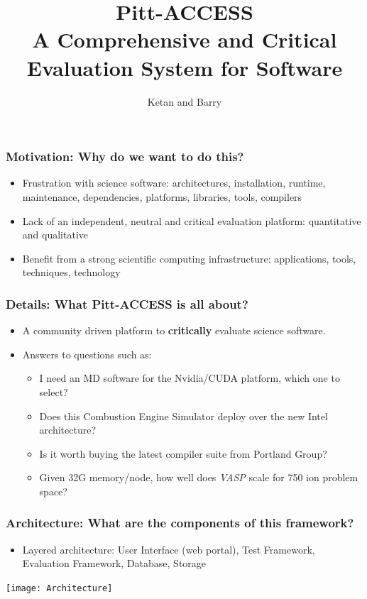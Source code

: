 \documentclass[hyperref={pdfpagelabels=false},12pt]{beamer}
\title[Pitt Access]{{\large Pitt-ACCESS\\ A Comprehensive and Critical Evaluation System for Software}}
\author[Pitt-Access]{{Ketan and Barry}}
\date{}
\begin{document}
\begin{frame}[plain]
\titlepage
\end{frame}

\begin{frame}
\frametitle{Motivation: Why do we want to do this?}
\begin{itemize}
\itemsep1em
\item 
Frustration with science software: architectures, installation, runtime, maintenance, dependencies, platforms, libraries, tools, compilers
\item 
Lack of an independent, neutral and critical evaluation platform: quantitative and qualitative
\item 
Benefit from a strong scientific computing infrastructure: applications, tools, techniques, technology
\end{itemize}
\end{frame}

\begin{frame}
\frametitle{Details: What Pitt-ACCESS is all about?}
\begin{itemize}
\itemsep1em
\item 
A community driven platform to \textbf{critically} evaluate science software.
\item 
Answers to questions such as:
\begin{itemize}
\item 
I need an MD software for the Nvidia/CUDA platform, which one to select?
\item 
Does this Combustion Engine Simulator deploy over the new Intel architecture?
\item 
Is it worth buying the latest compiler suite from Portland Group?
\item 
Given 32G memory/node, how well does \textit{VASP} scale for 750 ion problem space?
\end{itemize}
\end{itemize}

\end{frame}

\begin{frame}
\frametitle{Architecture: What are the components of this framework?}
\begin{itemize}
\item 
Layered architecture: User Interface (web portal), Test Framework, Evaluation Framework, Database, Storage
\end{itemize}
\texttt{[image: Architecture]}
\end{frame}
\end{document}
